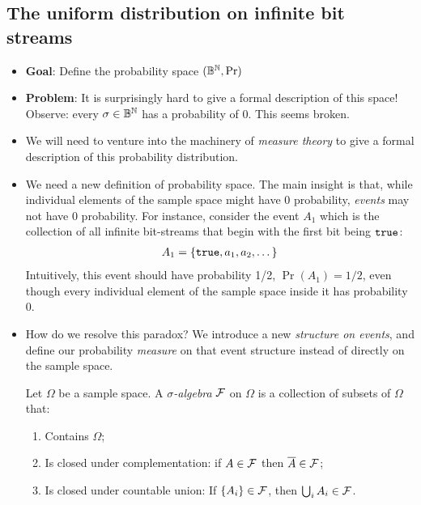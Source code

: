 \documentclass{tufte-handout}
\begin{document}
\subsection{The uniform distribution on infinite bit streams}
\begin{itemize}
  \item \textbf{Goal}: Define the probability space $(\mathbb{B}^{\mathbb{N}}, \Pr)$
  \item \textbf{Problem}: It is surprisingly hard to give a formal 
  description of this space! Observe: every $\sigma \in \mathbb{B}^{\mathbb{N}}$ 
  has a probability of 0. This seems broken.
  \item We will need to venture into the machinery of \emph{measure theory}
  to give a formal description of this probability distribution.
  \item We need a new definition of probability space. The main insight 
  is that, while individual elements of the sample space might have 0 probability,
  \emph{events} may not have 0 probability. For instance, consider the event $A_1$ 
  which is the collection of all infinite bit-streams that begin with the first 
  bit being $\texttt{true}$:
  \begin{align*}
    A_1 = \{\texttt{true}, a_1, a_2, \dots \}
  \end{align*}
  Intuitively, this event should have probability 1/2, $\Pr(A_1) = 1/2$, even though 
  every individual element of the sample space inside it has probability 0.

  \item How do we resolve this paradox? We introduce a new \emph{structure on events}, 
  and define our probability \emph{measure} on that event structure instead of 
  directly on the sample space.

  \begin{definition}
    Let $\Omega$ be a sample space.
    A \emph{$\sigma$-algebra} $\mathcal{F}$ on $\Omega$ is a collection of subsets of
    $\Omega$ that:
    \begin{enumerate}
      \item Contains $\Omega$;
      \item Is closed under complementation: if $A \in \mathcal{F}$ then $\overline{A} \in \mathcal{F}$;
      \item Is closed under countable union: If $\{A_i\} \in \mathcal{F}$, then $\bigcup_i A_i \in \mathcal{F}$.
    \end{enumerate}
  \end{definition}


\end{itemize}
\end{document}
